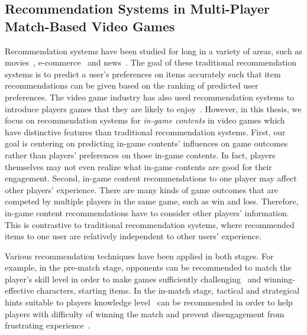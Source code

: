 

\subsection{Recommendation Systems in Multi-Player Match-Based Video Games}

Recommendation systems have been studied for long in a variety of areas, such as movies~\cite{amatriain2012netflix}, e-commerce~\cite{linden2003amazon} and news~\cite{das2007google}. The goal of these traditional recommendation systems is to predict a user's preferences on items accurately such that item recommendations can be given based on the ranking of predicted user preferences. The video game industry has also used recommendation systems to introduce players games that they are likely to enjoy~\cite{sifa2014archetypal,orland10}. However, in this thesis, we focus on recommendation systems for \textit{in-game contents} in video games which have distinctive features than traditional recommendation systems. First, our goal is centering on predicting in-game contents' influences on game outcomes rather than players' preferences on those in-game contents. In fact, players themselves may not even realize what in-game contents are good for their engagement. Second, in-game content recommendations to one player may affect other players' experience. There are many kinds of game outcomes that are competed by multiple players in the same game, such as win and loss. Therefore, in-game content recommendations have to consider other players' information. This is contrastive to traditional recommendation systems, where recommended items to one user are relatively independent to other users' experience.

Various recommendation techniques have been applied in both stages. For example, in the pre-match stage, opponents can be recommended to match the player's skill level in order to make games sufficiently challenging~\cite{sweetser2005gameflow,flow1990psychology,chen2007flow} and winning-effective characters, starting items. In the in-match stage, tactical and strategical hints suitable to players knowledge level~\cite{weber2009data,cunha2014rtsmate} can be recommended in order to help players with difficulty of winning the match and prevent disengagement from frustrating experience~\cite{schoenau2011player}.


